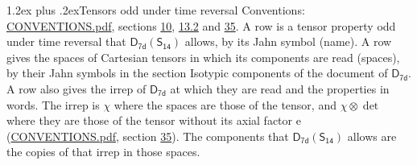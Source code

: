 \documentclass[10pt,a4paper]{article}
\makeatletter
\renewcommand\section{\@startsection{section}{1}{\z@}{-3ex plus -1ex minus -.2ex}%
  {1.2ex plus .2ex}{\normalfont\large\sffamily\bfseries\color{parttitle}}}
\numberwithin{equation}{section}
\newcommand{\grp}[1]{\mathsf{#1}}
\newcommand{\irrprod}{\otimes}
\makeatother
\begin{document}
\section{Tensors odd under time reversal}\label{s:time_odd}
Conventions: \href{../../CONVENTIONS.pdf}{CONVENTIONS.pdf}, sections \href{../../../rotation/CONVENTIONS.pdf\#conv.10}{10}, \href{../../../rotation/CONVENTIONS.pdf\#conv.13.2}{13.2} and \href{../../CONVENTIONS.pdf\#conv.35}{35}.
\leavevmode\label{n:head.name.property}A row is a tensor property odd under time reversal that $\grp{D_{7d}}(\grp{S_{14}})$ allows, by its Jahn symbol (name). \label{n:head.spaces}A row gives the spaces of Cartesian tensors in which its components are read (spaces), by their Jahn symbols in the section Isotypic components of the document of \href{../../../rotation/data/pdf/D7d.pdf}{$\grp{D_{7d}}$}. \label{n:head.properties}A row also gives the irrep of $\grp{D_{7d}}$ at which they are read and the properties in words. The irrep is $\chi$ where the spaces are those of the tensor, and $\chi \irrprod \det$ where they are those of the tensor without its axial factor e (\href{../../CONVENTIONS.pdf}{CONVENTIONS.pdf}, section \href{../../CONVENTIONS.pdf\#conv.35}{35}). The components that $\grp{D_{7d}}(\grp{S_{14}})$ allows are the copies of that irrep in those spaces.
\end{document}
